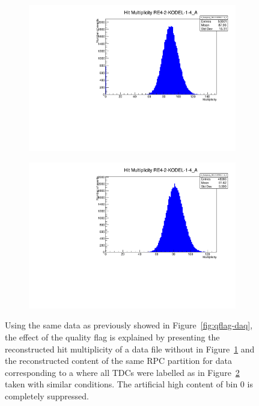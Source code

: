 	\begin{figure}[H]
        \begin{subfigure}{0.5\linewidth}
		    \centering
			\includegraphics[width = \linewidth]{fig/app1/No_Qflag_nhits_KODEL.pdf}
			\caption{\label{fig:qflag-kodel:A}}
		\end{subfigure}
		\begin{subfigure}{0.5\linewidth}
		    \centering
			\includegraphics[width = \linewidth]{fig/app1/With_Qflag_nhits_KODEL.pdf}
			\caption{\label{fig:qflag-kodel:B}}
		\end{subfigure}
		\caption{\label{fig:qflag-kodel} Using the same data as previously showed in Figure~\ref{fig:qflag-daq}, the effect of the quality flag is explained by presenting the reconstructed hit multiplicity of a data file without  in Figure~\ref{fig:qflag-kodel:A} and the reconstructed content of the same RPC partition for data corresponding to a  where all TDCs were labelled as  in Figure~\ref{fig:qflag-kodel:B} taken with similar conditions. The artificial high content of bin 0 is completely suppressed.}
	\end{figure}
	
